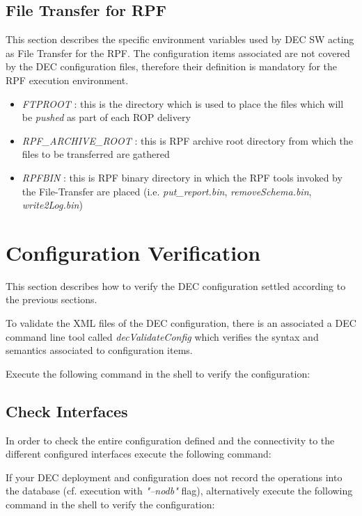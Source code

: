 \documentclass[dec_sum_main.tex]{subfiles}
\begin{document}
\subsection{File Transfer for RPF}
This section describes the specific environment variables used by DEC SW acting as File Transfer for the RPF. The configuration items associated are not covered by the DEC configuration files, therefore their definition is mandatory for the RPF execution environment.
\begin{itemize}
	\item \textit{FTPROOT} : this is the directory which is used to place the files which will be \textit{pushed} as part of each ROP delivery
	\item \textit{RPF\_ARCHIVE\_ROOT} : this is RPF archive root directory from which the files to be transferred are gathered
	\item \textit{RPFBIN} : this is RPF binary directory in which the RPF tools invoked by the File-Transfer are placed (i.e. \textit{put\_report.bin}, \textit{removeSchema.bin}, \textit{write2Log.bin})
\end{itemize}


\section{Configuration Verification}
This section describes how to verify the DEC configuration settled according to the previous sections. 


To validate the XML files of the DEC configuration, there is an associated a DEC command line tool called \textit{decValidateConfig} which verifies the syntax and semantics associated to  configuration items. \newline

\par 
\noindent
Execute the following command in the shell to verify the configuration:

 \newline

\par 

\subsection{Check Interfaces}
\noindent
In order to check the entire configuration defined and the connectivity to the different configured interfaces execute the following command:

 \newline


\par 
\noindent
If your DEC deployment and configuration does not record the operations into the database (cf. execution with \textit{"--nodb"} flag), alternatively execute the following command in the shell to verify the configuration:

 \newline
\end{document}
